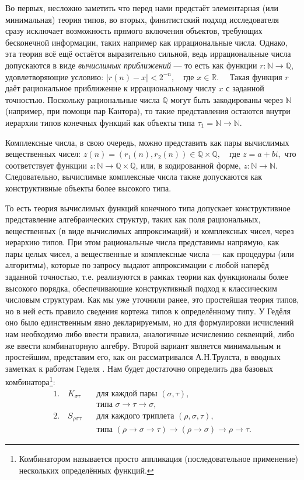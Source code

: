 \documentclass[14pt]{extarticle}
\begin{document}
	Во первых, несложно заметить что перед нами предстаёт элементарная (или минимальная) теория типов, во вторых, финитистский подход исследователя сразу исключает возможность прямого включения объектов, требующих бесконечной информации, таких например как иррациональные числа. Однако, эта теория всё ещё остаётся выразительно сильной, ведь иррациональные числа допускаются в виде \emph{вычислимых приближений} — то есть как функции \(r : \mathbb{N} \to \mathbb{Q}\), удовлетворяющие условию:
	\(
	|r(n) - x| < 2^{-n}, \quad \text{где } x \in \mathbb{R}. \quad
	\)
	Такая функция \(r\) даёт рациональное приближение к иррациональному числу \(x\) с заданной точностью. Поскольку рациональные числа \(\mathbb{Q}\) могут быть закодированы через \(\mathbb{N}\) (например, при помощи пар Кантора), то такие представления остаются внутри иерархии типов конечных функций как объекты типа \(\tau_1 = \mathbb{N} \to \mathbb{N}\).
	
	Комплексные числа, в свою очередь, можно представить как пары вычислимых вещественных чисел:
	\(
	z(n) = (r_1(n), r_2(n)) \in \mathbb{Q} \times \mathbb{Q}, \quad \text{где } z = a + bi,
	\) 
	что соответствует функции \(z : \mathbb{N} \to \mathbb{Q} \times \mathbb{Q}\), или, в кодированной форме, \(z : \mathbb{N} \to \mathbb{N}\). Следовательно, вычислимые комплексные числа также допускаются как конструктивные объекты более высокого типа. 
	
	То есть теория вычислимых функций конечного типа допускает конструктивное представление алгебраических структур, таких как поля рациональных, вещественных (в виде вычислимых аппроксимаций) и комплексных чисел, через иерархию типов. При этом рациональные числа представимы напрямую, как пары целых чисел, а вещественные и комплексные числа — как процедуры (или алгоритмы), которые по запросу выдают аппроксимации с любой наперёд заданной точностью, т.е. реализуются в рамках теории как функционалы более высокого порядка, обеспечивающие конструктивный подход к классическим числовым структурам. Как мы уже уточнили ранее, это простейшая теория типов, но  в ней есть правило сведения кортежа типов к определённому типу. У Гедёля оно было единственным явно декларируемым, но для формулировки исчислений нам необходимо либо ввести правила, аналогичные исчислению секвенций, либо же ввести комбинаторную алгебру. Второй вариант является минимальным и простейшим, представим его, как он рассматривался А.Н.Трулста, в вводных заметках к работам Геделя \cite{Troelstra1995}. Нам будет достаточно определить два базовых комбинатора\footnote{Комбинатором называется просто аппликация (последовательное применение) нескольких определённых функций.}:
	\begin{align*}
		1. \quad K_{\sigma\tau} 
		&\quad \text{для каждой пары } (\sigma, \tau), \\
		&\quad \text{типа } \sigma \rightarrow \tau \rightarrow \sigma, \\[0.5em]
		2. \quad S_{\rho\sigma\tau} 
		&\quad \text{для каждого триплета } (\rho, \sigma, \tau), \\
		&\quad \text{типа } (\rho \rightarrow \sigma \rightarrow \tau) \rightarrow 
		 (\rho \rightarrow \sigma) \rightarrow \rho \rightarrow \tau.
	\end{align*}
\end{document}
